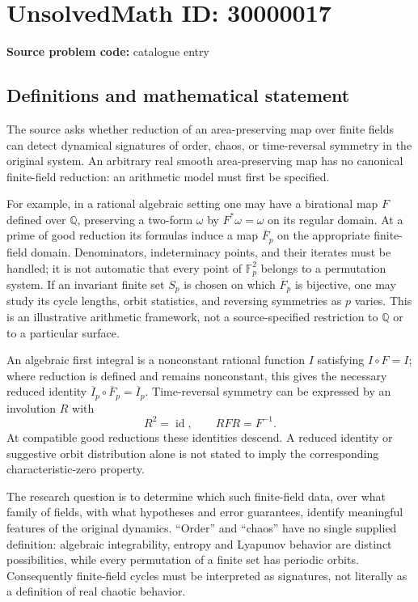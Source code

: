 \documentclass[11pt]{article}
\newcommand{\Q}{\mathbb{Q}}
\newcommand{\F}{\mathbb{F}}
\begin{document}
\section*{UnsolvedMath ID: 30000017}
\textbf{Source problem code:} catalogue entry
\subsection{Definitions and mathematical statement}
The source asks whether reduction of an area-preserving map over finite fields can detect dynamical signatures of order, chaos, or time-reversal symmetry in the original system. An arbitrary real smooth area-preserving map has no canonical finite-field reduction: an arithmetic model must first be specified.

For example, in a rational algebraic setting one may have a birational map $F$ defined over $\Q$, preserving a two-form $\omega$ by $F^*\omega=\omega$ on its regular domain. At a prime of good reduction its formulas induce a map $\overline F_p$ on the appropriate finite-field domain. Denominators, indeterminacy points, and their iterates must be handled; it is not automatic that every point of $\F_p^2$ belongs to a permutation system. If an invariant finite set $S_p$ is chosen on which $\overline F_p$ is bijective, one may study its cycle lengths, orbit statistics, and reversing symmetries as $p$ varies. This is an illustrative arithmetic framework, not a source-specified restriction to $\Q$ or to a particular surface.

An algebraic first integral is a nonconstant rational function $I$ satisfying $I\circ F=I$; where reduction is defined and remains nonconstant, this gives the necessary reduced identity $\overline I_p\circ\overline F_p=\overline I_p$. Time-reversal symmetry can be expressed by an involution $R$ with
\[
 R^2=\operatorname{id},\qquad RFR=F^{-1}.
\]
At compatible good reductions these identities descend. A reduced identity or suggestive orbit distribution alone is not stated to imply the corresponding characteristic-zero property.

The research question is to determine which such finite-field data, over what family of fields, with what hypotheses and error guarantees, identify meaningful features of the original dynamics. ``Order'' and ``chaos'' have no single supplied definition: algebraic integrability, entropy and Lyapunov behavior are distinct possibilities, while every permutation of a finite set has periodic orbits. Consequently finite-field cycles must be interpreted as signatures, not literally as a definition of real chaotic behavior.
\end{document}
